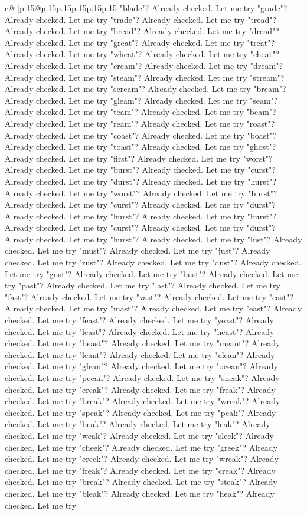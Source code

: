 \documentclass{article}
\begin{document}
{\begin{supertabular}{c@{$\;$}|p{.15\linewidth}@{}p{.15\linewidth}p{.15\linewidth}p{.15\linewidth}p{.15\linewidth}p{.15\linewidth}}
{{{"blade"? Already checked. Let me try "grade"? Already checked. Let me try "trade"? Already checked. Let me try "tread"? Already checked. Let me try "bread"? Already checked. Let me try "dread"? Already checked. Let me try "great"? Already checked. Let me try "treat"? Already checked. Let me try "wheat"? Already checked. Let me try "cheat"? Already checked. Let me try "cream"? Already checked. Let me try "dream"? Already checked. Let me try "steam"? Already checked. Let me try "stream"? Already checked. Let me try "scream"? Already checked. Let me try "bream"? Already checked. Let me try "gleam"? Already checked. Let me try "seam"? Already checked. Let me try "team"? Already checked. Let me try "beam"? Already checked. Let me try "ream"? Already checked. Let me try "roast"? Already checked. Let me try "coast"? Already checked. Let me try "boast"? Already checked. Let me try "toast"? Already checked. Let me try "ghost"? Already checked. Let me try "first"? Already checked. Let me try "worst"? Already checked. Let me try "burst"? Already checked. Let me try "curst"? Already checked. Let me try "durst"? Already checked. Let me try "hurst"? Already checked. Let me try "worst"? Already checked. Let me try "burst"? Already checked. Let me try "curst"? Already checked. Let me try "durst"? Already checked. Let me try "hurst"? Already checked. Let me try "burst"? Already checked. Let me try "curst"? Already checked. Let me try "durst"? Already checked. Let me try "hurst"? Already checked. Let me try "lust"? Already checked. Let me try "must"? Already checked. Let me try "just"? Already checked. Let me try "rust"? Already checked. Let me try "dust"? Already checked. Let me try "gust"? Already checked. Let me try "bust"? Already checked. Let me try "past"? Already checked. Let me try "last"? Already checked. Let me try "fast"? Already checked. Let me try "vast"? Already checked. Let me try "cast"? Already checked. Let me try "mast"? Already checked. Let me try "east"? Already checked. Let me try "feast"? Already checked. Let me try "yeast"? Already checked. Let me try "least"? Already checked. Let me try "heast"? Already checked. Let me try "beast"? Already checked. Let me try "meant"? Already checked. Let me try "leant"? Already checked. Let me try "clean"? Already checked. Let me try "glean"? Already checked. Let me try "ocean"? Already checked. Let me try "pecan"? Already checked. Let me try "sneak"? Already checked. Let me try "creak"? Already checked. Let me try "freak"? Already checked. Let me try "break"? Already checked. Let me try "wreak"? Already checked. Let me try "speak"? Already checked. Let me try "peak"? Already checked. Let me try "beak"? Already checked. Let me try "leak"? Already checked. Let me try "weak"? Already checked. Let me try "sleek"? Already checked. Let me try "cheek"? Already checked. Let me try "greek"? Already checked. Let me try "creek"? Already checked. Let me try "wreak"? Already checked. Let me try "freak"? Already checked. Let me try "creak"? Already checked. Let me try "break"? Already checked. Let me try "steak"? Already checked. Let me try "bleak"? Already checked. Let me try "fleak"? Already checked. Let me try }}}
\end{supertabular}}
\end{document}
